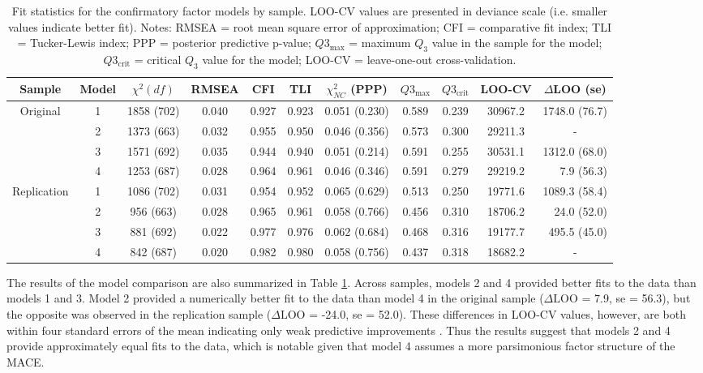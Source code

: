 \documentclass[letterpaper,man,natbib,floatsintext,longtable]{apa6}
\begin{document}
\begin{table}[t!]
\small
\centering
\begin{adjustbox}{center}
\begin{tabular}{ccccccccccr}
\toprule
Sample & Model & $\chi^2 (df)$ &  RMSEA & CFI & TLI & $\chi^2_{NC}$ (PPP) & $Q3_{\max}$ &  $Q3_{\text{crit}}$ & LOO-CV & \multicolumn{1}{c}{$\Delta$LOO (se)} \\
\midrule
Original & 1 &  1858 (702) &  0.040 &  0.927 &  0.923 &  0.051 (0.230) &  0.589 &  0.239 &  30967.2 &  1748.0 (76.7) \\
& 2 &  1373 (663) &  0.032 &  0.955 &  0.950 &  0.046 (0.356) &  0.573 &  0.300 &  29211.3 & \multicolumn{1}{c}{-} \\
& 3 &  1571 (692) &  0.035 &  0.944 &  0.940 &  0.051 (0.214) &  0.591 &  0.255 &  30531.1 &  1312.0 (68.0) \\
& 4 &  1253 (687) &  0.028 &  0.964 &  0.961 &  0.046 (0.346) &  0.591 &  0.279 &  29219.2 & 7.9 (56.3) \\
\midrule
Replication & 1 &  1086 (702) &  0.031 &  0.954 &  0.952 &  0.065 (0.629) &  0.513 &  0.250 &  19771.6 &  1089.3 (58.4) \\
& 2 &   956 (663) &  0.028 &  0.965 &  0.961 &  0.058 (0.766) &  0.456 &  0.310 &  18706.2 &    24.0 (52.0) \\
& 3 &   881 (692) &  0.022 &  0.977 &  0.976 &  0.062 (0.684) &  0.468 &  0.316 &  19177.7 &   495.5 (45.0) \\
& 4 &   842 (687) &  0.020 &  0.982 &  0.980 &  0.058 (0.756) &  0.437 &  0.318 &  18682.2 & \multicolumn{1}{c}{-} \\
\bottomrule
\end{tabular}
\end{adjustbox}
\captionsetup{width=1.1\textwidth}
\caption{\normalfont Fit statistics for the confirmatory factor models by sample. LOO-CV values are presented in deviance scale (i.e. smaller values indicate better fit). Notes: RMSEA = root mean square error of approximation; CFI = comparative fit index; TLI = Tucker-Lewis index; PPP = posterior predictive p-value; $Q3_{\max}$ = maximum $Q_3$ value in the sample for the model; $Q3_{\text{crit}}$ = critical $Q_3$ value for the model; LOO-CV = leave-one-out cross-validation.}
\label{table:cfa_diagnostics}
\end{table}

The results of the model comparison are also summarized in Table \ref{table:cfa_diagnostics}. Across samples, models 2 and 4 provided better fits to the data than models 1 and 3. Model 2 provided a numerically better fit to the data than model 4 in the original sample ($\Delta \text{LOO}$ = 7.9, se = 56.3), but the opposite was observed in the replication sample ($\Delta \text{LOO}$ = -24.0, se = 52.0). These differences in LOO-CV values, however, are both within four standard errors of the mean indicating only weak predictive improvements \citep{vehtari2022cv}. Thus the results suggest that models 2 and 4 provide approximately equal fits to the data, which is notable given that model 4 assumes a more parsimonious factor structure of the MACE.
\end{document}
